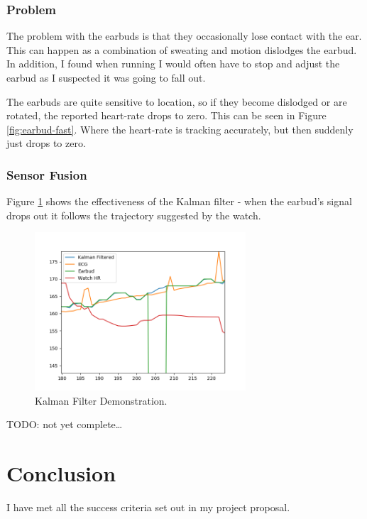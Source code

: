 \documentclass[12pt,a4paper,twoside,openright]{report}
\begin{document}
\subsection{Problem} \label{sec:earbud-problem}

The problem with the earbuds is that they occasionally lose contact with the
ear. This can happen as a combination of sweating and motion dislodges the
earbud. In addition, I found when running I would often have to stop and
adjust the earbud as I suspected it was going to fall out. 

The earbuds are quite sensitive to location, so if they become dislodged or
are rotated, the reported heart-rate drops to zero. This can be seen in Figure
\ref{fig:earbud-fast}. Where the heart-rate is tracking accurately, but then
suddenly just drops to zero.

\subsection{Sensor Fusion}

Figure \ref{fig:kalman-working} shows the effectiveness of the Kalman filter -
when the earbud's signal drops out it follows the trajectory suggested by the
watch.

\begin{figure}[tbh]
	\centerline{\includegraphics[width=0.7\textwidth]{figs/kalman-working.png}}
	\caption{Kalman Filter Demonstration.}
	\label{fig:kalman-working}
\end{figure}


TODO: not yet complete\ldots

\chapter{Conclusion}

I have met all the success criteria set out in my project proposal.
\end{document}
